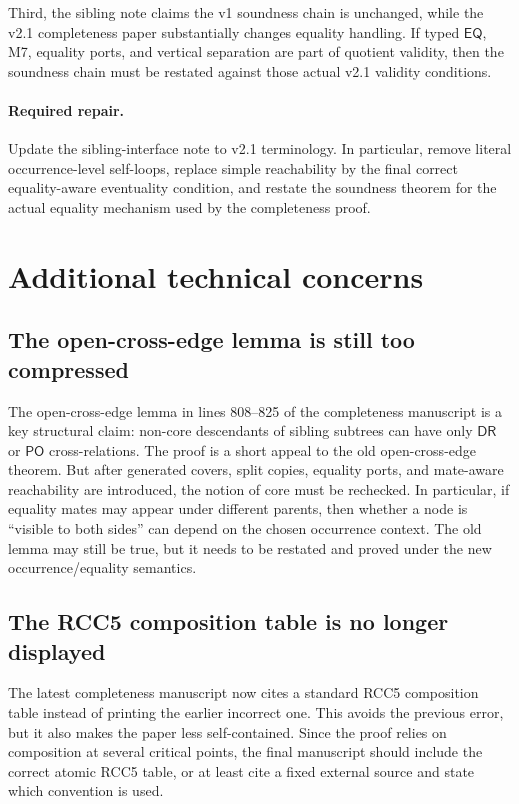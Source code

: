 \documentclass[11pt]{article}
\newcommand{\DR}{\mathsf{DR}}
\newcommand{\PO}{\mathsf{PO}}
\newcommand{\EQ}{\mathsf{EQ}}
\begin{document}
Third, the sibling note claims the v1 soundness chain is unchanged, while the
v2.1 completeness paper substantially changes equality handling.  If typed
\(\EQ\), M7, equality ports, and vertical separation are part of quotient
validity, then the soundness chain must be restated against those actual v2.1
validity conditions.

\paragraph{Required repair.}
Update the sibling-interface note to v2.1 terminology.  In particular, remove
literal occurrence-level self-loops, replace simple reachability by the final
correct equality-aware eventuality condition, and restate the soundness theorem
for the actual equality mechanism used by the completeness proof.

\section{Additional technical concerns}

\subsection{The open-cross-edge lemma is still too compressed}

The open-cross-edge lemma in lines 808--825 of the completeness manuscript is a
key structural claim: non-core descendants of sibling subtrees can have only
\(\DR\) or \(\PO\) cross-relations.  The proof is a short appeal to the old
open-cross-edge theorem.  But after generated covers, split copies, equality
ports, and mate-aware reachability are introduced, the notion of core must be
rechecked.  In particular, if equality mates may appear under different parents,
then whether a node is ``visible to both sides'' can depend on the chosen
occurrence context.  The old lemma may still be true, but it needs to be
restated and proved under the new occurrence/equality semantics.

\subsection{The RCC5 composition table is no longer displayed}

The latest completeness manuscript now cites a standard RCC5 composition table
instead of printing the earlier incorrect one.  This avoids the previous error,
but it also makes the paper less self-contained.  Since the proof relies on
composition at several critical points, the final manuscript should include the
correct atomic RCC5 table, or at least cite a fixed external source and state
which convention is used.
\end{document}
